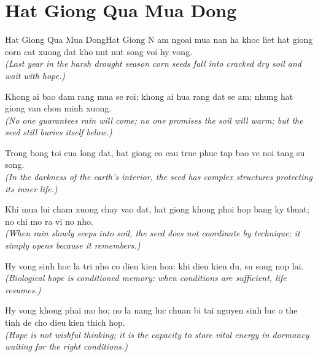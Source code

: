 \section{Hat Giong Qua Mua Dong}
\begin{truyen}{Hat Giong Qua Mua Dong}{Hat Giong}
N am ngoai mua nan ha khoc liet hat giong corn cat xuong dat kho nut nut song voi hy vong.\\
\textit{(Last year in the harsh drought season corn seeds fall into cracked dry soil and wait with hope.)}

Khong ai bao dam rang mua se roi; khong ai hua rang dat se am; nhung hat giong van chon minh xuong.\\
\textit{(No one guarantees rain will come; no one promises the soil will warm; but the seed still buries itself below.)}

Trong bong toi cua long dat, hat giong co cau truc phuc tap bao ve noi tang su song.\\
\textit{(In the darkness of the earth's interior, the seed has complex structures protecting its inner life.)}

Khi mua lui cham xuong chay vao dat, hat giong khong phoi hop bang ky thuat; no chi mo ra vi no nho.\\
\textit{(When rain slowly seeps into soil, the seed does not coordinate by technique; it simply opens because it remembers.)}

Hy vong sinh hoc la tri nho co dieu kien hoa: khi dieu kien du, su song nop lai.\\
\textit{(Biological hope is conditioned memory: when conditions are sufficient, life resumes.)}

\end{truyen}
\begin{baihoc}
  Hy vong khong phai mo ho; no la nang luc chuan bi tai nguyen sinh luc o the tinh de cho dieu kien thich hop.\\
  \textit{(Hope is not wishful thinking; it is the capacity to store vital energy in dormancy waiting for the right conditions.)}
\end{baihoc}

